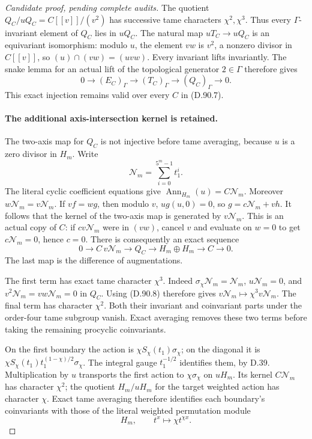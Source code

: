 \begin{proof}[Candidate proof, pending complete audits]
The quotient \(Q_C/uQ_C=C[[v]]/(v^2)\) has successive
tame characters \(\chi^2,\chi^3\). Thus every
\(\Gamma\)-invariant element of \(Q_C\) lies in \(uQ_C\).
The natural map \(uT_C\to uQ_C\) is an equivariant
isomorphism: modulo \(u\), the element \(vw\) is
\(v^2\), a nonzero divisor in \(C[[v]]\), so
\((u)\cap(vw)=(uvw)\). Every invariant lifts invariantly.
The snake lemma for an actual lift of the topological
generator \(2\in\Gamma\) therefore gives
\[
 0\longrightarrow(E_C)_\Gamma\longrightarrow(T_C)_\Gamma
                  \longrightarrow(Q_C)_\Gamma\longrightarrow0.
                                                               \tag{D.90.11}
\]
This exact injection remains valid over every \(C\) in (D.90.7).

\paragraph{The additional axis-intersection kernel is retained.}
The two-axis map for \(Q_C\) is not injective before tame
averaging, because \(u\) is a zero divisor in \(H_m\).
Write
\[
                    \mathcal N_m=\sum_{i=0}^{5^m-1}t_1^i.
\]
The literal cyclic coefficient equations give
\(\operatorname{Ann}_{H_m}(u)=C\mathcal N_m\).
Moreover \(w\mathcal N_m=v\mathcal N_m\).
If \(vf=wg\), then modulo \(v\),
\(u g(u,0)=0\), so \(g=c\mathcal N_m+vh\).
It follows that the kernel of the two-axis map is
generated by \(v\mathcal N_m\). This is an actual copy
of \(C\): if \(c v\mathcal N_m\) were in \((vw)\),
cancel \(v\) and evaluate on \(w=0\) to get
\(c\mathcal N_m=0\), hence \(c=0\).
There is consequently an exact sequence
\[
 0\longrightarrow C\,v\mathcal N_m\longrightarrow Q_C
 \longrightarrow H_m\oplus H_m\longrightarrow C\longrightarrow0.
                                                               \tag{D.90.12}
\]
The last map is the difference of augmentations.

The first term has exact tame character \(\chi^3\).
Indeed \(\sigma_\chi\mathcal N_m=\mathcal N_m\),
\(u\mathcal N_m=0\), and
\(v^2\mathcal N_m=vw\mathcal N_m=0\) in \(Q_C\).
Using (D.90.8) therefore gives
\(v\mathcal N_m\mapsto\chi^3 v\mathcal N_m\).
The final term has character \(\chi^2\). Both their
invariant and coinvariant parts under the order-four tame
subgroup vanish. Exact averaging removes these two terms
before taking the remaining procyclic coinvariants.

On the first boundary the action is
\(\chi S_\chi(t_1)\sigma_\chi\); on the diagonal it is
\(\chi S_\chi(t_1)t_1^{(1-\chi)/2}\sigma_\chi\).
The integral gauge \(t_1^{-1/2}\) identifies them, by D.39.
Multiplication by \(u\) transports the first action to
\(\chi\sigma_\chi\) on \(uH_m\).
Its kernel \(C\mathcal N_m\) has character \(\chi^2\);
the quotient \(H_m/uH_m\) for the target weighted action
has character \(\chi\). Exact tame averaging therefore
identifies each boundary's coinvariants with those of the
literal weighted permutation module
\[
                H_m,\qquad t^x\longmapsto\chi t^{\chi x}.
                                                               \tag{D.90.13}
\]


\end{proof}
